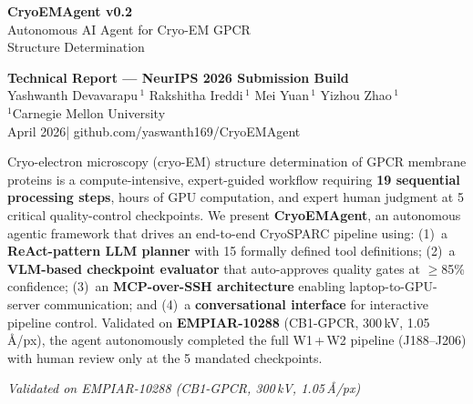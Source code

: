 \documentclass[12pt, a4paper]{article}
\begin{document}
\begin{titlepage}
\centering
\vspace*{1.8cm}

{\Huge\bfseries\color{titlebg} CryoEMAgent v0.2}\\[0.6em]
{\LARGE\color{agentblue}
  Autonomous AI Agent for Cryo-EM GPCR\\[0.2em]
  Structure Determination}\\[2.2em]

\begin{tcolorbox}[
  colback=titlebg!6, colframe=titlebg,
  width=0.80\textwidth, arc=6pt, boxrule=1pt,
  left=8pt, right=8pt, top=8pt, bottom=8pt
]
\centering
{\small\bfseries Technical Report --- NeurIPS 2026 Submission Build}\\[0.5em]
\normalsize
Yashwanth Devavarapu\,$^{1}$\quad
Rakshitha Ireddi\,$^{1}$\quad
Mei Yuan\,$^{1}$\quad
Yizhou Zhao\,$^{1}$\\[0.4em]
{\small $^{1}$Carnegie Mellon University}\\[0.6em]
April 2026\quad|\quad
{\small\ttfamily github.com/yaswanth169/CryoEMAgent}
\end{tcolorbox}

\vspace{2em}

\begin{tcolorbox}[
  colback=gray!4, colframe=gray!35,
  width=0.80\textwidth, arc=4pt, boxrule=0.6pt,
  title={\small\bfseries Abstract},
  fonttitle=\bfseries\small,
  attach boxed title to top left={yshift=-2mm, xshift=6mm},
  boxed title style={colback=gray!35, colframe=gray!35, arc=2pt}
]
\small
Cryo-electron microscopy (cryo-EM) structure determination of GPCR membrane
proteins is a compute-intensive, expert-guided workflow requiring
\textbf{19 sequential processing steps}, hours of GPU computation, and expert
human judgment at 5 critical quality-control checkpoints.
We present \textbf{CryoEMAgent}, an autonomous agentic framework that drives
an end-to-end CryoSPARC pipeline using:
(1)~a \textbf{ReAct-pattern LLM planner} with 15 formally defined tool
definitions;
(2)~a \textbf{VLM-based checkpoint evaluator} that auto-approves quality gates
at $\geq$85\% confidence;
(3)~an \textbf{MCP-over-SSH architecture} enabling laptop-to-GPU-server
communication; and
(4)~a \textbf{conversational interface} for interactive pipeline control.
Validated on \textbf{EMPIAR-10288} (CB1-GPCR, 300\,kV, 1.05\,\AA/px), the
agent autonomously completed the full W1\,+\,W2 pipeline (J188--J206) with
human review only at the 5 mandated checkpoints.
\end{tcolorbox}

\vfill
{\small\itshape Validated on EMPIAR-10288 (CB1-GPCR, 300\,kV, 1.05\,\AA/px)}
\end{titlepage}
\end{document}
